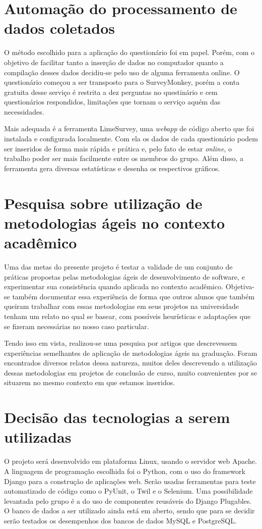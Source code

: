 \documentclass[a4paper,12pt,font=plain,header=plain]{abnt}
\begin{document}
  \section{Automação do processamento de dados coletados}
    O método escolhido para a aplicação do questionário foi em papel. Porém, com o objetivo de facilitar tanto a inserção de dados no computador quanto a compilação desses dados decidiu-se pelo uso de alguma ferramenta online. O questionário começou a ser transposto para o SurveyMonkey, porém a conta gratuita desse serviço é restrita a dez perguntas no questinário e cem questionários respondidos, limitações que tornam o serviço aquém das necessidades.

    Mais adequada é a ferramenta LimeSurvey, uma \textit{webapp} de código aberto que foi instalada e configurada localmente. Com ela os dados de cada questionário podem ser inseridos de forma mais rápida e prática e, pelo fato de estar \textit{online}, o trabalho poder ser mais facilmente entre os membros do grupo. Além disso, a ferramenta gera diversas estatísticas e desenha os respectivos gráficos.

  \section{Pesquisa sobre utilização de metodologias ágeis no contexto acadêmico}
    Uma das metas do presente projeto é testar a validade de um conjunto de práticas propostas pelas metodologias ágeis de desenvolvimento de software, e experimentar sua consistência quando aplicada no contexto acadêmico. Objetiva-se também documentar essa experiência de forma que outros alunos que também queiram trabalhar com essas metodologias em seus projetos na universidade tenham um relato no qual se basear, com possíveis heurísticas e adaptações que se fizeram necessárias no nosso caso particular.

    Tendo isso em vista, realizou-se uma pesquisa por artigos que descrevessem experiências semelhantes de aplicação de metodologias ágeis na graduação. Foram encontrados diversos relatos dessa natureza, muitos deles descrevendo a utilização dessas metodologias em projetos de conclusão de curso, muito convenientes por se situarem no mesmo contexto em que estamos inseridos.

  \section{Decisão das tecnologias a serem utilizadas}
    O projeto será desenvolvido em plataforma Linux, usando o servidor web Apache. A linguagem de programação escolhida foi o Python, com o uso do framework Django para a construção de aplicações web. Serão usadas ferramentas para teste automatizado de código como o PyUnit, o Twil e o Selenium. Uma possibilidade levantada pelo grupo é a do uso de componentes reusáveis do Django Plugables. O banco de dados a ser utilizado ainda está em aberto, sendo que para se decidir serão testados os desempenhos dos bancos de dados MySQL e PostgreSQL.
\end{document}
